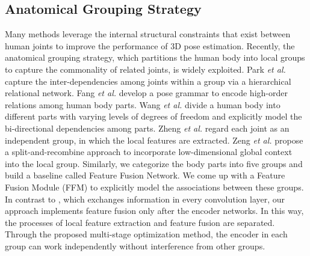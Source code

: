 \documentclass[sigconf]{acmart}
\begin{document}
\subsection{Anatomical Grouping Strategy}
Many methods \cite{park20183d,cai2019exploiting,tekin2016structured,ci2019optimizing,cheng2019occlusion,wang2019not,moreno20173d,wang2018drpose3d,wang2011learning} leverage the internal structural constraints that exist between human joints to improve the performance of 3D pose estimation. Recently, the anatomical grouping strategy, which partitions the human body into local groups to capture the commonality of related joints, is widely exploited. Park \textit{et al.} \cite{park20183d} capture the inter-dependencies among joints within a group via a hierarchical relational network. Fang \textit{et al.} \cite{fang2018learning} develop a pose grammar to encode high-order relations among human body parts. Wang \textit{et al.} \cite{wang2019not} divide a human body into different parts with varying levels of degrees of freedom and explicitly model the bi-directional dependencies among parts. Zheng \textit{et al.} \cite{zheng2020joint} regard each joint as an independent group, in which the local features are extracted. Zeng \textit{et al.} \cite{zeng2020srnet} propose a split-and-recombine approach to incorporate low-dimensional global context into the local group. Similarly, we categorize the body parts into five groups and build a baseline called Feature Fusion Network. We come up with a Feature Fusion Module (FFM) to explicitly model the associations between these groups. In contrast to \cite{zeng2020srnet}, which exchanges information in every convolution layer, our approach implements feature fusion only after the encoder networks. In this way, the processes of local feature extraction and feature fusion are separated. Through the proposed multi-stage optimization method, the encoder in each group can work independently without interference from other groups.
\end{document}
